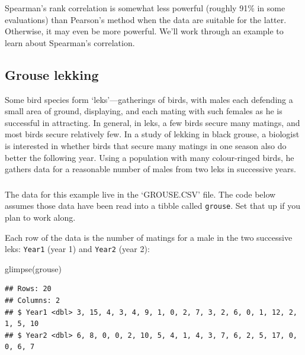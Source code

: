 \documentclass[
]{book}
\newenvironment{Shaded}{\begin{snugshade}}{\end{snugshade}}
\newcommand{\FunctionTok}[1]{\textcolor[rgb]{0.00,0.00,0.00}{#1}}
\newcommand{\NormalTok}[1]{#1}
\newenvironment{greybox}{
  \definecolor{shadecolor}{rgb}{0.95,0.95,0.95}  %
  \color{black}
  \begin{shaded}}
 {\end{shaded}}
\newenvironment{infobox}[1]
  {
  \begin{itemize}
  \renewcommand{\labelitemi}{
    \raisebox{-.7\height}[0pt][0pt]{
      {\setkeys{Gin}{width=3em,keepaspectratio}
        \texttt{[image: images/\#1]}}
    }
  }
  \setlength{\fboxsep}{1em}
  \begin{greybox}
  \item
  }
  {
  \end{greybox}
  \end{itemize}
  }
\begin{document}
Spearman's rank correlation is somewhat less powerful (roughly 91\% in some evaluations) than Pearson's method when the data are suitable for the latter. Otherwise, it may even be more powerful. We'll work through an example to learn about Spearman's correlation.

\hypertarget{grouse-lekking}{%
\subsection{Grouse lekking}\label{grouse-lekking}}

Some bird species form `leks'---gatherings of birds, with males each defending a small area of ground, displaying, and each mating with such females as he is successful in attracting. In general, in leks, a few birds secure many matings, and most birds secure relatively few. In a study of lekking in black grouse, a biologist is interested in whether birds that secure many matings in one season also do better the following year. Using a population with many colour-ringed birds, he gathers data for a reasonable number of males from two leks in successive years.

\begin{infobox}{action}

\hypertarget{section-23}{%
\subsubsection*{}\label{section-23}}

The data for this example live in the `GROUSE.CSV' file. The code below assumes those data have been read into a tibble called \texttt{grouse}. Set that up if you plan to work along.

\end{infobox}

Each row of the data is the number of matings for a male in the two successive leks: \texttt{Year1} (year 1) and \texttt{Year2} (year 2):

\begin{Shaded}
\begin{Highlighting}[]
\FunctionTok{glimpse}\NormalTok{(grouse)}
\end{Highlighting}
\end{Shaded}

\begin{verbatim}
## Rows: 20
## Columns: 2
## $ Year1 <dbl> 3, 15, 4, 3, 4, 9, 1, 0, 2, 7, 3, 2, 6, 0, 1, 12, 2, 1, 5, 10
## $ Year2 <dbl> 6, 8, 0, 0, 2, 10, 5, 4, 1, 4, 3, 7, 6, 2, 5, 17, 0, 0, 6, 7
\end{verbatim}
\end{document}
